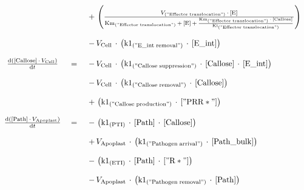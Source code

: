 $$\begin{array}{ccl}
 \; && \;  { \, + \, \left(\frac {{V}_{\mathrm{("Effector\;translocation")}} \, \cdot \, {\mathrm{[E]}} }  { {{\mathrm{Km}}_{\mathrm{("Effector\;translocation")}} \, + \, {\mathrm{[E]}} }  \, + \, \frac {{\mathrm{Km}}_{\mathrm{("Effector\;translocation")}} \, \cdot \, {\mathrm{[Callose]}} } {{\mathrm{Ki}}_{\mathrm{("Effector\;translocation")}} } } \right) } \\ 
 && \\ 
 \; && \;  { \, - \, {V}_{\mathrm{Cell}} \, \cdot \, \left( {{\mathrm{k1}}_{\mathrm{("E\_int\;removal")}} \, \cdot \, {\mathrm{[E\_int]}} } \right) } \\ 
 && \\ 
\frac {\mathrm{d}\left( {{\mathrm{[Callose]}} \, \cdot \, {V}_{\mathrm{Cell}} } \right) }  {\mathrm{d}{t} }  \; &=& \;  { \, - \, {V}_{\mathrm{Cell}} \, \cdot \, \left( {{\mathrm{k1}}_{\mathrm{("Callose\;suppression")}} \, \cdot \, {\mathrm{[Callose]}} \, \cdot \, {\mathrm{[E\_int]}} } \right) } \\ 
 && \\ 
 \; && \;  { \, - \, {V}_{\mathrm{Cell}} \, \cdot \, \left( {{\mathrm{k1}}_{\mathrm{("Callose\;removal")}} \, \cdot \, {\mathrm{[Callose]}} } \right) } \\ 
 && \\ 
 \; && \;  { \, + \, \left( {{\mathrm{k1}}_{\mathrm{("Callose\;production")}} \, \cdot \, {\mathrm{["PRR*"]}} } \right) } \\ 
 && \\ 
\frac {\mathrm{d}\left( {{\mathrm{[Path]}} \, \cdot \, {V}_{\mathrm{Apoplast}} } \right) }  {\mathrm{d}{t} }  \; &=& \;  { \, - \, \left( {{\mathrm{k1}}_{\mathrm{(PTI)}} \, \cdot \, {\mathrm{[Path]}} \, \cdot \, {\mathrm{[Callose]}} } \right) } \\ 
 && \\ 
 \; && \;  { \, + \, {V}_{\mathrm{Apoplast}} \, \cdot \, \left( {{\mathrm{k1}}_{\mathrm{("Pathogen\;arrival")}} \, \cdot \, {\mathrm{[Path\_bulk]}} } \right) } \\ 
 && \\ 
 \; && \;  { \, - \, \left( {{\mathrm{k1}}_{\mathrm{(ETI)}} \, \cdot \, {\mathrm{[Path]}} \, \cdot \, {\mathrm{["R*"]}} } \right) } \\ 
 && \\ 
 \; && \;  { \, - \, {V}_{\mathrm{Apoplast}} \, \cdot \, \left( {{\mathrm{k1}}_{\mathrm{("Pathogen\;removal")}} \, \cdot \, {\mathrm{[Path]}} } \right) } \\ 
 && \\ 

\end{array}$$
